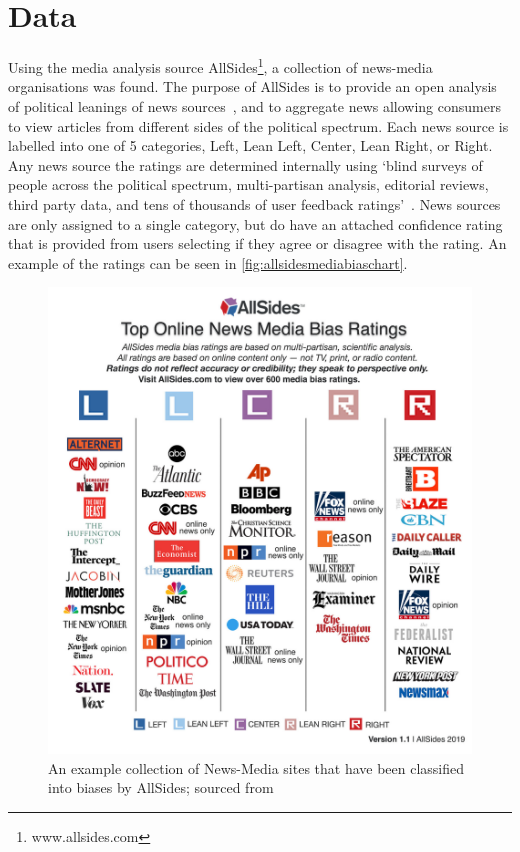 \section{Data}

Using the media analysis source AllSides\footnote{www.allsides.com}, a collection of news-media organisations was found. The purpose of AllSides is to provide an open  analysis of political leanings of news sources~, and to aggregate news allowing consumers to view articles from different sides of the political spectrum. Each news source is labelled into one of 5 categories, Left, Lean Left, Center, Lean Right, or Right. Any news source the ratings are determined internally using `blind surveys of people across the political spectrum, multi-partisan analysis, editorial reviews, third party data, and tens of thousands of user feedback ratings'~. News sources are only assigned to a single category, but do have an attached confidence rating that is provided from users selecting if they agree or disagree with the rating. An example of the ratings can be seen in \autoref{fig:allsidesmediabiaschart}.

\begin{figure}
	\centering
	\includegraphics[width=0.9\linewidth]{chapter1/figs/AllSidesMediaBiasChart}
	\caption{An example collection of News-Media sites that have been classified into biases by AllSides; sourced from }
	\label{fig:allsidesmediabiaschart}
\end{figure}



